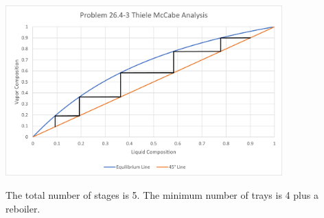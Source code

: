\documentclass[12pt]{article}
\begin{document}
\begin{enumerate}
\begin{enumerate}
        \begin{center}
            \includegraphics[width=0.8\textwidth]{assets/p4.png}
        \end{center}

        The total number of stages is 5. The minimum number of trays is 4 plus a reboiler.
    \end{enumerate}
    
\end{enumerate}
\end{document}

